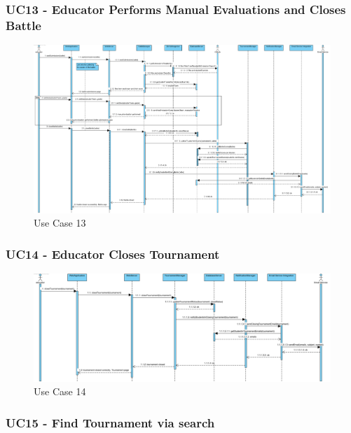 \documentclass{article}
\begin{document}
\subsubsection*{UC13 - Educator Performs Manual Evaluations and Closes Battle}

\begin{figure}[H]
    \centering
    \includegraphics[width=1\textwidth]{images/UseCaseSequenceDiagrams/UC13}
    \caption{Use Case 13}
    \label{fig:UC13}
\end{figure}

\subsubsection*{UC14 - Educator Closes Tournament}

\begin{figure}[H]
    \centering
    \includegraphics[width=1\textwidth]{images/UseCaseSequenceDiagrams/UC14}
    \caption{Use Case 14}
    \label{fig:UC14}
\end{figure}

\subsubsection*{UC15 - Find Tournament via search}
\end{document}
